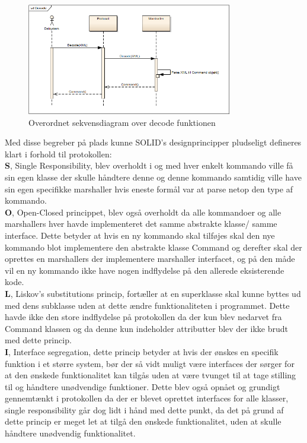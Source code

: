 \begin{figure}[H]
	\centering
	\includegraphics[width=0.8\textwidth]{Projektbeskrivelse/DesignOgImplementering/SharedLib/Images/Rapport/Decode.png}
	\caption{Overordnet sekvensdiagram over decode funktionen}
	\label{fig:DecodeSL}
\end{figure}


Med disse begreber på plads kunne SOLID's designprincipper pludseligt defineres klart i forhold til protokollen:\\

\textbf{S}, Single Responsibility, blev overholdt i og med hver enkelt kommando ville få sin egen klasse der skulle håndtere denne og denne kommando samtidig ville have sin egen specifikke marshaller hvis eneste formål var at parse netop den type af kommando.\\

\textbf{O}, Open-Closed princippet, blev også overholdt da alle kommandoer og alle marshallers hver havde implementeret det samme abstrakte klasse/ samme interface. Dette betyder at hvis en ny kommando skal tilføjes skal den nye kommando blot implementere den abstrakte klasse Command og derefter skal der oprettes en marshallers der implementere marshaller interfacet, og på den måde vil en ny kommando ikke have nogen indflydelse på den allerede eksisterende kode.\\

\textbf{L}, Liskov's substitutions princip, fortæller at en superklasse skal kunne byttes ud med dens subklasse uden at dette ændre funktionaliteten i programmet. Dette havde ikke den store indflydelse på protokollen da der kun blev nedarvet fra Command klassen og da denne kun indeholder attributter blev der ikke brudt med dette princip.\\

\textbf{I}, Interface segregation, dette princip betyder at hvis der ønskes en specifik funktion i et større system, bør der så vidt muligt være interfaces der sørger for at den ønskede funktionalitet kan tilgås uden at være tvunget til at tage stilling til og håndtere unødvendige funktioner. Dette blev også opnået og grundigt gennemtænkt i protokollen da der er blevet oprettet interfaces for alle klasser, single responsibility går dog lidt i hånd med dette punkt, da det på grund af dette princip er meget let at tilgå den ønskede funktionalitet, uden at skulle håndtere unødvendig funktionalitet.\\


